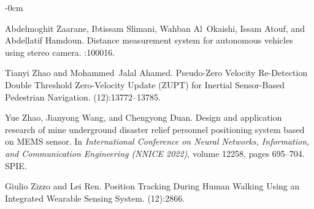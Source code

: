 \documentclass[engproc,conferenceproceedings,submit,pdftex,moreauthors]{Definitions/mdpi}
\begin{document}
\begin{adjustwidth}{-\extralength}{0cm}
\begin{thebibliography}{999}
Abdelmoghit Zaarane, Ibtissam Slimani, Wahban Al~Okaishi, Issam Atouf, and
Abdellatif Hamdoun.
\newblock Distance measurement system for autonomous vehicles using stereo
camera.
:100016.

Tianyi Zhao and Mohammed~Jalal Ahamed.
\newblock Pseudo-{{Zero Velocity Re-Detection Double Threshold Zero-Velocity
		Update}} ({{ZUPT}}) for {{Inertial Sensor-Based Pedestrian Navigation}}.
(12):13772--13785.

Yue Zhao, Jianyong Wang, and Chengyong Duan.
\newblock Design and application research of mine underground disaster relief
personnel positioning system based on {{MEMS}} sensor.
\newblock In {\em International {{Conference}} on {{Neural Networks}},
	{{Information}}, and {{Communication Engineering}} ({{NNICE}} 2022)}, volume
12258, pages 695--704. {SPIE}.

Giulio Zizzo and Lei Ren.
\newblock Position {{Tracking During Human Walking Using}} an {{Integrated
		Wearable Sensing System}}.
(12):2866.
\end{thebibliography}

%


\end{adjustwidth}
\end{document}
